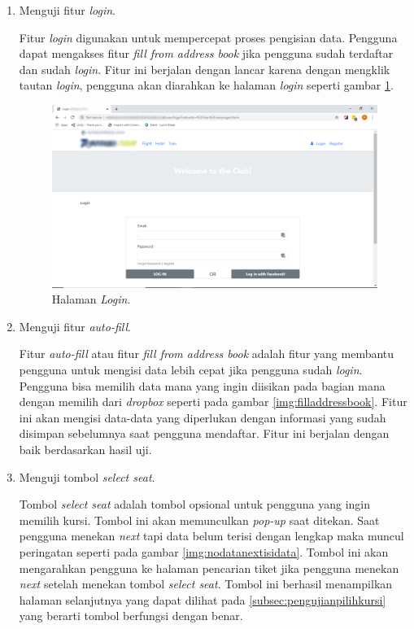 \begin{enumerate}
        \item Menguji fitur \textit{login}.
        
        Fitur \textit{login} digunakan untuk mempercepat proses pengisian data. Pengguna dapat mengakses fitur \textit{fill from address book} jika pengguna sudah terdaftar dan sudah \textit{login}. Fitur ini berjalan dengan lancar karena dengan mengklik tautan \textit{login}, pengguna akan diarahkan ke halaman \textit{login} seperti gambar \ref{img:halamanlogin}.
        
        \begin{figure}[H]
        \center
        \includegraphics[width=\textwidth,height=\textheight,keepaspectratio]{Gambar/Login screen.png}
        \caption{Halaman \textit{Login}.}
            \label{img:halamanlogin}
        \end{figure}
        
        \item Menguji fitur \textit{auto-fill}.
        
        Fitur \textit{auto-fill} atau fitur \textit{fill from address book} adalah fitur yang membantu pengguna untuk mengisi data lebih cepat jika pengguna sudah \textit{login}. Pengguna bisa memilih data mana yang ingin diisikan pada bagian mana dengan memilih dari \textit{dropbox} seperti pada gambar \ref{img:filladdressbook}. Fitur ini akan mengisi data-data yang diperlukan dengan informasi yang sudah disimpan sebelumnya saat pengguna mendaftar. Fitur ini berjalan dengan baik berdasarkan hasil uji.
        
        \item Menguji tombol \textit{select seat}.
        
        Tombol \textit{select seat} adalah tombol opsional untuk pengguna yang ingin memilih kursi. Tombol ini akan memunculkan \textit{pop-up} saat ditekan. Saat pengguna menekan \textit{next} tapi data belum terisi dengan lengkap maka muncul peringatan  seperti pada gambar \ref{img:nodatanextisidata}. Tombol ini akan mengarahkan pengguna ke halaman pencarian tiket jika pengguna menekan \textit{next} setelah menekan tombol \textit{select seat}. Tombol ini berhasil menampilkan halaman selanjutnya yang dapat dilihat pada \ref{subsec:pengujianpilihkursi} yang berarti tombol berfungsi dengan benar.
        

\end{enumerate}
